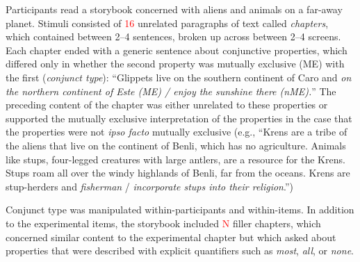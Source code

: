 \documentclass[10pt,letterpaper]{article}
\newcommand{\red}[1]{{\textcolor{Red}{#1}}}
\begin{document}
Participants read a storybook concerned with aliens and animals on a far-away planet.
Stimuli consisted of \red{16} unrelated paragraphs of text called \emph{chapters}, which contained between 2--4 sentences, broken up across between 2--4 screens.
Each chapter ended with a generic sentence about conjunctive properties, which differed only in whether the second property was mutually exclusive (ME) with the first (\emph{conjunct type}): ``Glippets live on the southern continent of Caro and \emph{on the northern continent of Este (ME) /  enjoy the sunshine there (nME).}''
The preceding content of the chapter was either unrelated to these properties or supported the mutually exclusive interpretation of the properties in the case that the properties were not \emph{ipso facto} mutually exclusive (e.g., ``Krens are a tribe of the aliens that live on the continent of Benli, which has no agriculture. Animals like stups, four-legged creatures with large antlers, are a resource for the Krens. Stups roam all over the windy highlands of Benli, far from the oceans. Krens are stup-herders and \emph{fisherman} / \emph{incorporate stups into their religion}.'')

Conjunct type was manipulated within-participants and within-items. 
In addition to the experimental items, the storybook included \red{N} filler chapters, which concerned similar content to the experimental chapter but which asked about properties that were described with explicit quantifiers such as \emph{most}, \emph{all}, or \emph{none}. 

\end{document}
